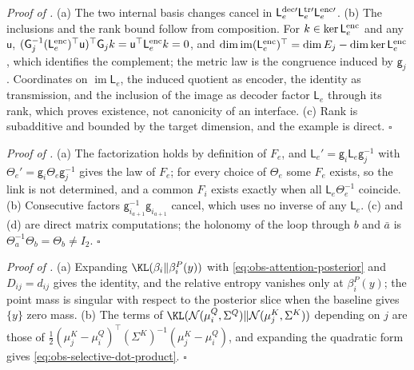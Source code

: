 \noindent\emph{Proof of .}
(a) The two internal basis changes cancel in
\(\mathsf L^{\rm dec\prime}_e\mathsf L^{\rm tr\prime}_e\mathsf L^{\rm enc\prime}_e\).
(b) The inclusions and the rank bound follow from composition. For
\(k\in\ker\mathsf L^{\rm enc}_e\) and any \(\mathsf u\),
\((\mathsf G_j^{-1}(\mathsf L^{\rm enc}_e)^\top\mathsf u)^\top\mathsf G_jk
=\mathsf u^\top\mathsf L^{\rm enc}_ek=0\), and
\(\dim\operatorname{im}(\mathsf L^{\rm enc}_e)^\top=\dim E_j-\dim\ker
\mathsf L^{\rm enc}_e\), which identifies the complement; the metric law is the
congruence induced by \(\mathsf g_j\). Coordinates on
\(\operatorname{im}\mathsf L_e\), the induced quotient as encoder, the identity
as transmission, and the inclusion of the image as decoder factor
\(\mathsf L_e\) through its rank, which proves existence, not canonicity of an
interface. (c) Rank is subadditive and bounded by the target dimension, and
the example is direct. \(\square\)

\noindent\emph{Proof of .}
(a) The factorization holds by definition of \(F_e\), and
\(\mathsf L_e'=\mathsf g_i\mathsf L_e\mathsf g_j^{-1}\) with
\(\Theta_e'=\mathsf g_i\Theta_e\mathsf g_j^{-1}\) gives the law of \(F_e\); for
every choice of \(\Theta_e\) some \(F_e\) exists, so the link is not
determined, and a common \(F_i\) exists exactly when all
\(\mathsf L_e\Theta_e^{-1}\) coincide. (b) Consecutive factors
\(\mathsf g_{i_{a+1}}^{-1}\mathsf g_{i_{a+1}}\) cancel, which uses no inverse of
any \(\mathsf L_e\). (c) and (d) are direct matrix computations; the holonomy
of the loop through \(b\) and \(\bar a\) is
\(\Theta_a^{-1}\Theta_b=\Theta_b\ne I_2\). \(\square\)

\noindent\emph{Proof of .}
(a) Expanding \(\KL(\beta_i\Vert\beta_i^P(y))\) with
\eqref{eq:obs-attention-posterior} and \(D_{ij}=d_{ij}\) gives the identity,
and the relative entropy vanishes only at \(\beta_i^P(y)\); the point mass is
singular with respect to the posterior slice when the baseline gives \(\{y\}\)
zero mass. (b) The terms of
\(\KL(\mathcal N(\mu^Q_i,\Sigma^Q)\Vert\mathcal N(\mu^K_j,\Sigma^K))\) depending
on \(j\) are those of
\(\frac12(\mu^K_j-\mu^Q_i)^\top(\Sigma^K)^{-1}(\mu^K_j-\mu^Q_i)\), and expanding
the quadratic form gives \eqref{eq:obs-selective-dot-product}. \(\square\)

